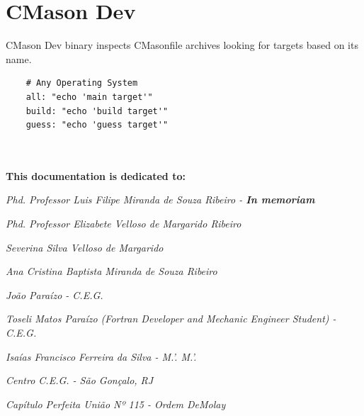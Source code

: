 \documentclass[]{article}
\begin{document}
\section{CMason Dev}
CMason Dev binary inspects CMasonfile archives looking for targets based on its name.

\begin{verbatim}
	# Any Operating System
	all: "echo 'main target'"
	build: "echo 'build target'"
	guess: "echo 'guess target'"
	
	
\end{verbatim}


\textbf{This documentation is dedicated to:}



\emph{Phd. Professor Luis Filipe Miranda de Souza Ribeiro - \textbf{In memoriam}}

\emph{Phd. Professor Elizabete Velloso de Margarido Ribeiro}

\emph{Severina Silva Velloso de Margarido}

\emph{Ana Cristina Baptista Miranda de Souza Ribeiro}


\emph{João Paraízo - C.E.G.}

\emph{Toseli Matos Paraízo (Fortran Developer and Mechanic Engineer Student) - C.E.G.}

\emph{Isaías Francisco Ferreira da Silva - M.'. M.'.}


\emph{Centro C.E.G. - São Gonçalo, RJ}


\emph{Capítulo Perfeita União Nº 115 - Ordem DeMolay}
\end{document}
